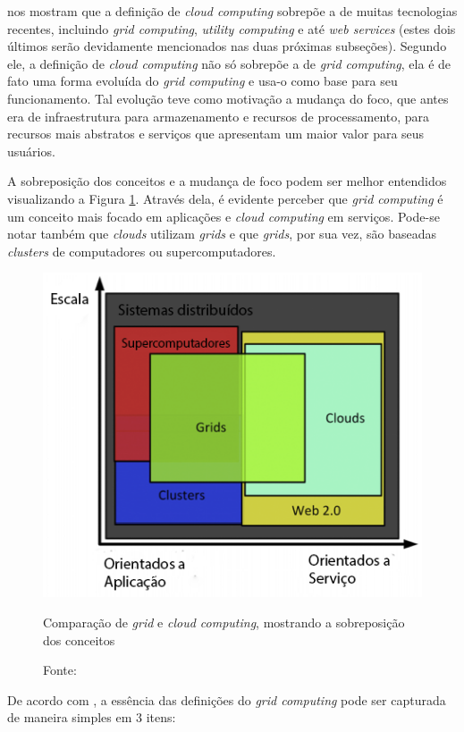  nos mostram que a definição de \emph{cloud computing}
sobrepõe a de muitas tecnologias recentes, incluindo \emph{grid computing},
\emph{utility computing} e até \textit{web services} (estes dois últimos serão
devidamente mencionados nas duas próximas subseções). Segundo ele,
a definição de \emph{cloud computing} não só sobrepõe a de \emph{grid computing}, ela é de fato uma forma evoluída do
\emph{grid computing} e usa-o como base para seu funcionamento. Tal evolução teve como motivação a mudança do foco, que
antes era de infraestrutura para armazenamento e recursos de processamento, para recursos mais abstratos e serviços que apresentam um maior valor para seus usuários.

A sobreposição dos conceitos e a mudança de foco podem ser melhor entendidos visualizando a Figura \ref{img:grid-cloud-compared}.
Através dela, é evidente perceber que \emph{grid computing} é um conceito mais focado em aplicações e \emph{cloud computing} em serviços.
Pode-se notar também que \emph{clouds} utilizam \emph{grids} e que \emph{grids}, por sua vez, são baseadas \emph{clusters} de
computadores ou supercomputadores.

\begin{figure}[h]
  \center
  \includegraphics[scale=0.6]{imagem/grid-cloud-compared.png}
  \caption{Comparação de \emph{grid} e \emph{cloud computing}, mostrando a sobreposição dos conceitos}
  \caption*{Fonte: }
  \label{img:grid-cloud-compared}
\end{figure}

De acordo com , a essência das definições do \emph{grid computing} pode ser capturada de
maneira simples em 3 itens:

